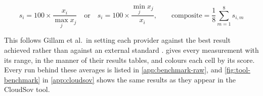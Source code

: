\begin{equation}
  \label{eq:bench-score}
  s_{i} = 100 \times \frac{x_{i}}{\max_{j} x_{j}}
  \quad\text{or}\quad
  s_{i} = 100 \times \frac{\min_{j} x_{j}}{x_{i}},
  \qquad
  \text{composite} = \frac{1}{8}\sum_{m=1}^{8} s_{i,m}
\end{equation}

This follows Gillam et al.\ in setting each provider against the best result
achieved rather than against an external standard
\cite{Gillam_FairBenchmarking_2013}.  gives every
measurement with its range, in the manner of their results tables, and colours
each cell by its score. Every run behind these averages is listed in
\cref{app:benchmark-raw}, and \cref{fig:tool-benchmark} in \cref{app:cloudsov}
shows the same results as they appear in the CloudSov tool.

